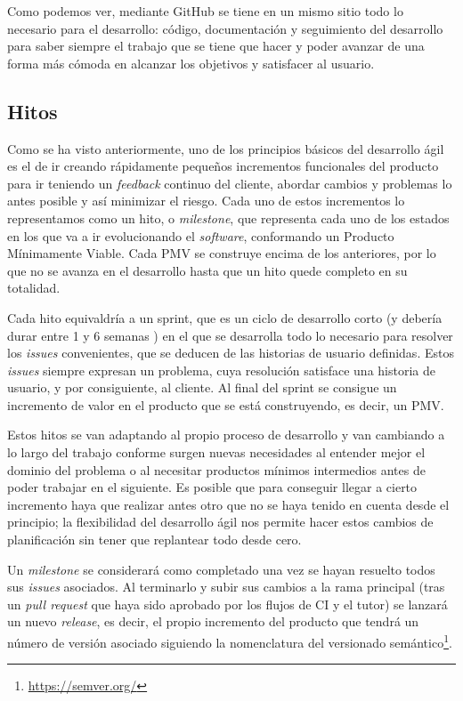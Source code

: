 Como podemos ver, mediante GitHub se tiene en un mismo sitio todo lo necesario
para el desarrollo: código, documentación y seguimiento del desarrollo para
saber siempre el trabajo que se tiene que hacer y poder avanzar de una forma más
cómoda en alcanzar los objetivos y satisfacer al usuario. 

\subsection{Hitos}
Como se ha visto anteriormente, uno de los principios básicos del desarrollo
ágil es el de ir creando rápidamente pequeños incrementos funcionales del
producto para ir teniendo un \textit{feedback} continuo del cliente, abordar
cambios y problemas lo antes posible y así minimizar el riesgo. Cada uno de
estos incrementos lo representamos como un hito, o \textit{milestone}, que
representa cada uno de los estados en los que va a ir evolucionando el
\textit{software}, conformando un Producto Mínimamente Viable. Cada PMV se
construye encima de los anteriores, por lo que no se avanza en el desarrollo
hasta que un hito quede completo en su totalidad. 

Cada hito equivaldría a un sprint, que es un ciclo de desarrollo corto (y
debería durar entre 1 y 6 semanas \cite{abrahamsson2017agile}) en el que se
desarrolla todo lo necesario para resolver los \textit{issues} convenientes, que
se deducen de las historias de usuario definidas. Estos \textit{issues} siempre
expresan un problema, cuya resolución satisface una historia de usuario, y por
consiguiente, al cliente. Al final del sprint se consigue un incremento de valor
en el producto que se está construyendo, es decir, un PMV. 

Estos hitos se van adaptando al propio proceso de desarrollo y van cambiando a
lo largo del trabajo conforme surgen nuevas necesidades al entender mejor el
dominio del problema o al necesitar productos mínimos intermedios antes de poder
trabajar en el siguiente. Es posible que para conseguir llegar a cierto
incremento haya que realizar antes otro que no se haya tenido en cuenta desde el
principio; la flexibilidad del desarrollo ágil nos permite hacer estos cambios
de planificación sin tener que replantear todo desde cero.

Un \textit{milestone} se considerará como completado una vez se hayan resuelto
todos sus \textit{issues} asociados. Al terminarlo y subir sus cambios a la rama
principal (tras un \textit{pull request} que haya sido aprobado por los flujos
de CI y el tutor) se lanzará un nuevo \textit{release}, es decir, el propio
incremento del producto que tendrá un número de versión asociado siguiendo la
nomenclatura del versionado semántico\footnote{\url{https://semver.org/}}.


